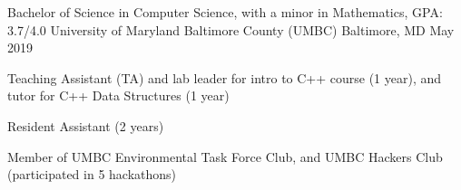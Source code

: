 
\begin{cventries}
  \cventry
    {Bachelor of Science in Computer Science, with a minor in Mathematics, GPA: 3.7/4.0} %
    {University of Maryland Baltimore County (UMBC)} %
    {Baltimore, MD} %
    {May 2019} %
    {
      \begin{cvitems}
        \item{Teaching Assistant (TA) and lab leader for intro to C++ course (1 year), and tutor for C++ Data Structures (1 year)}
        \item{Resident Assistant (2 years)}
        \item{Member of UMBC Environmental Task Force Club, and UMBC Hackers Club (participated in 5 hackathons)}
      \end{cvitems}
    }
\end{cventries}
